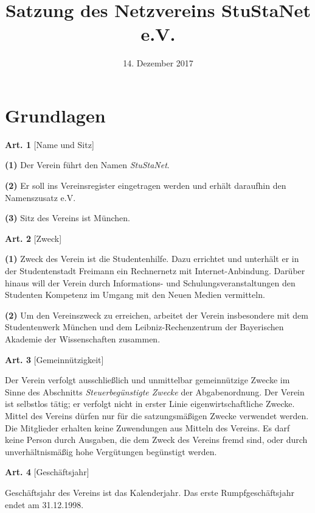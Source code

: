 \documentclass[12pt]{article}
\title{\bf Satzung des Netzvereins StuStaNet e.V.}
\date{14. Dezember 2017}
\newcommand{\Abschnitt}[1]{\section{#1}}
\newcommand{\Satz}[2]{

\begin{samepage}
{\bf (#1)} #2
\end{samepage}
}
\newenvironment{Artikel}[2]{
\bigskip \centerline{{\bf Art. #1} [#2]}
\nopagebreak
}{
}
\begin{document}
\maketitle

\Abschnitt{Grundlagen}

\begin{Artikel}{1}{Name und Sitz}

\Satz{1}{Der Verein führt den Namen {\it StuStaNet}.}

\Satz{2}{Er soll ins Vereinsregister eingetragen werden und erhält daraufhin den Namenszusatz e.V.}

\Satz{3}{Sitz des Vereins ist München.}

\end{Artikel}

\begin{Artikel}{2}{Zweck}

\Satz{1}{Zweck des Verein ist die Studentenhilfe.
Dazu errichtet und unterhält er in der Studentenstadt Freimann ein Rechnernetz mit Internet-Anbindung.
Darüber hinaus will der Verein durch Informations- und Schulungsveranstaltungen den Studenten Kompetenz im Umgang mit den Neuen Medien vermitteln.}

\Satz{2}{Um den Vereinszweck zu erreichen, arbeitet der Verein insbesondere mit dem Studentenwerk München und dem Leibniz-Rechenzentrum der Bayerischen Akademie der Wissenschaften zusammen.}

\end{Artikel}

\begin{Artikel}{3}{Gemeinnützigkeit}
Der Verein verfolgt ausschließlich und unmittelbar gemeinnützige Zwecke im Sinne des Abschnitts {\it Steuerbegünstigte Zwecke} der Abgabenordnung.
Der Verein ist selbstlos tätig; er verfolgt nicht in erster Linie eigenwirtschaftliche Zwecke.
Mittel des Vereins dürfen nur für die satzungsmäßigen Zwecke verwendet werden.
Die Mitglieder erhalten keine Zuwendungen aus Mitteln des Vereins.
Es darf keine Person durch Ausgaben, die dem Zweck des Vereins fremd sind, oder durch unverhältnismäßig hohe Vergütungen begünstigt werden.

\end{Artikel}


\begin{Artikel}{4}{Geschäftsjahr}

Geschäftsjahr des Vereins ist das Kalenderjahr. Das erste Rumpfgeschäftsjahr endet am 31.12.1998.

\end{Artikel}
\end{document}
